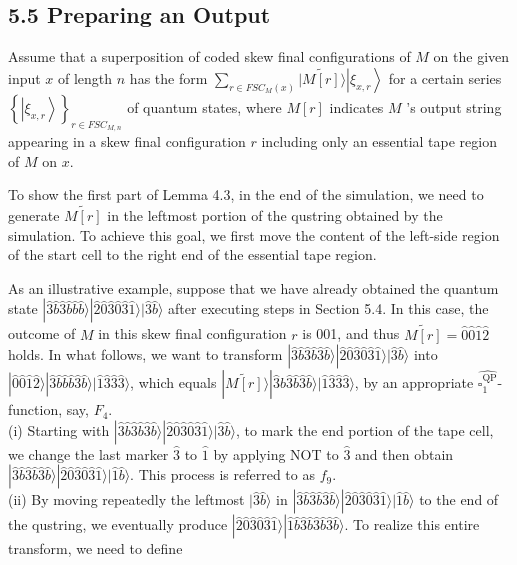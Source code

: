 \documentclass[10pt]{article}
\begin{document}
\subsection*{5.5 Preparing an Output}
Assume that a superposition of coded skew final configurations of $M$ on the given input $x$ of length $n$ has the form $\sum_{r \in F S C_{M}(x)}|\widetilde{M[r]}\rangle\left|\xi_{x, r}\right\rangle$ for a certain series $\left\{\left|\xi_{x, r}\right\rangle\right\}_{r \in F S C_{M, n}}$ of quantum states, where $M[r]$ indicates $M$ 's output string appearing in a skew final configuration $r$ including only an essential tape region of $M$ on $x$.

To show the first part of Lemma 4.3, in the end of the simulation, we need to generate $\widetilde{M[r]}$ in the leftmost portion of the qustring obtained by the simulation. To achieve this goal, we first move the content of the left-side region of the start cell to the right end of the essential tape region.

As an illustrative example, suppose that we have already obtained the quantum state $|\hat{3} \hat{b} \hat{3} \hat{b} \hat{b} \hat{b}\rangle|\hat{2} \hat{0} \hat{3} \hat{0} \hat{3} \hat{1}\rangle|\hat{3} \hat{b}\rangle$ after executing steps in Section 5.4. In this case, the outcome of $M$ in this skew final configuration $r$ is 001, and thus $\widetilde{M[r]}=\hat{0} \hat{0} \hat{1} \hat{2}$ holds. In what follows, we want to transform $|\hat{3} \hat{b} \hat{3} \hat{b} \hat{3} \hat{b}\rangle|\hat{2} \hat{0} \hat{3} \hat{0} \hat{3} \hat{1}\rangle|\hat{3} \hat{b}\rangle$ into $|\hat{0} \hat{0} \hat{1} \hat{2}\rangle|\hat{3} \hat{b} \hat{b} \hat{b} \hat{3} \hat{b}\rangle|\hat{1} \hat{3} \hat{3} \hat{3}\rangle$, which equals $|\widetilde{M[r]}\rangle|\hat{3} \hat{b} \hat{3} \hat{b} \hat{3} \hat{b}\rangle|\hat{1} \hat{3} \hat{3} \hat{3}\rangle$, by an appropriate $\widehat{\square_{1}^{\mathrm{QP}}}$-function, say, $F_{4}$.\\
(i) Starting with $|\hat{3} \hat{b} \hat{3} \hat{b} \hat{3} \hat{b}\rangle|\hat{2} \hat{0} \hat{3} \hat{0} \hat{3} \hat{1}\rangle|\hat{3} \hat{b}\rangle$, to mark the end portion of the tape cell, we change the last marker $\hat{3}$ to $\hat{1}$ by applying NOT to $\hat{3}$ and then obtain $|\hat{3} \hat{b} \hat{3} \hat{b} \hat{3} \hat{b}\rangle|\hat{2} \hat{0} \hat{3} \hat{0} \hat{3} \hat{1}\rangle|\hat{1} \hat{b}\rangle$. This process is referred to as $f_{9}$.\\
(ii) By moving repeatedly the leftmost $|\hat{3} \hat{b}\rangle$ in $|\hat{3} \hat{b} \hat{3} \hat{b} \hat{3} \hat{b}\rangle|\hat{2} \hat{0} \hat{3} \hat{0} \hat{3} \hat{1}\rangle|\hat{1} \hat{b}\rangle$ to the end of the qustring, we eventually produce $|\hat{2} \hat{0} \hat{3} \hat{0} \hat{3} \hat{1}\rangle|\hat{1} \hat{b} \hat{3} \hat{b} \hat{3} \hat{b} \hat{3} \hat{b}\rangle$. To realize this entire transform, we need to define
\end{document}
